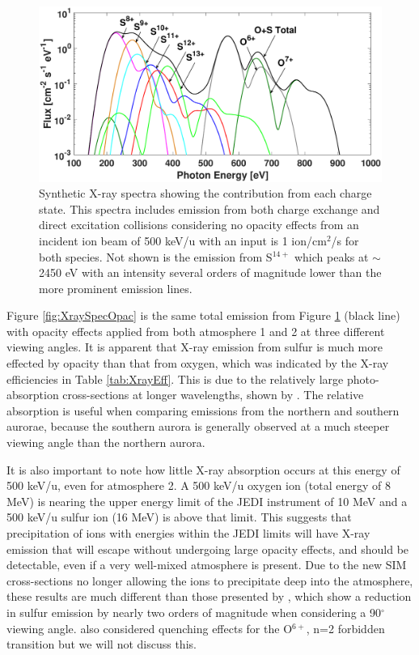 \documentclass[draft]{agujournal2018}
\begin{document}
\begin{figure}
    \centering
    \includegraphics[width=\textwidth]{Figures/O+S_CX+DE_500keVNoOpacSpec.eps}
    \caption{Synthetic X-ray spectra showing the contribution from each charge state. This spectra includes emission from both charge exchange and direct excitation collisions considering no opacity effects from an incident ion beam of 500 keV/u with an input is 1 ion/cm$^2$/s for both species. Not shown is the emission from S$^{14+}$ which peaks at $\sim$2450 eV with an intensity several orders of magnitude lower than the more prominent emission lines.}
    \label{fig:XraySpec}
\end{figure}

Figure \ref{fig:XraySpecOpac} is the same total emission from Figure \ref{fig:XraySpec} (black line) with opacity effects applied from both atmosphere 1 and 2 at three different viewing angles.
It is apparent that X-ray emission from sulfur is much more effected by opacity than that from oxygen, which was indicated by the X-ray efficiencies in Table \ref{tab:XrayEff}.
This is due to the relatively large photo-absorption cross-sections at longer wavelengths, shown by \citet{cravens2006}.
The relative absorption is useful when comparing emissions from the northern and southern aurorae, because the southern aurora is generally observed at a much steeper viewing angle than the northern aurora.

It is also important to note how little X-ray absorption occurs at this energy of 500 keV/u, even for atmosphere 2.
A 500 keV/u oxygen ion (total energy of 8 MeV) is nearing the upper energy limit of the JEDI instrument of 10 MeV \citep{mauk2017ssr} and a 500 keV/u sulfur ion (16 MeV) is above that limit.
This suggests that precipitation of ions with energies within the JEDI limits will have X-ray emission that will escape without undergoing large opacity effects, and should be detectable, even if a very well-mixed atmosphere is present.
Due to the new SIM cross-sections no longer allowing the ions to precipitate deep into the atmosphere, these results are much different than those presented by \citet{ozak2010}, which show a reduction in sulfur emission by nearly two orders of magnitude when considering a 90$^{\circ}$ viewing angle.
\citet{ozak2010} also considered quenching effects for the O$^{6+}$, n=2 forbidden transition but we will not discuss this.
\end{document}
